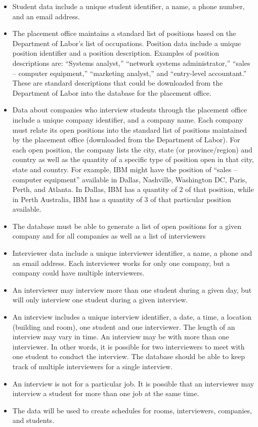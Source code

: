 \documentclass{article}
\begin{document}
\begin{itemize}
  \item Student data include a unique student identifier, a name, a phone number, and an email address.

  \item The placement office maintains a standard list of positions based on the Department of Labor’s list of occupations. Position data include a unique position identifier and a position description. Examples of position descriptions are: “Systems analyst,” “network systems administrator,” “sales – computer equipment,” “marketing analyst,” and “entry-level accountant.” These are standard descriptions that could be downloaded from the Department of Labor into the database for the placement office.

  \item Data about companies who interview students through the placement office include a unique company identifier, and a company name. Each company must relate its open positions into the standard list of positions maintained by the placement office (downloaded from the Department of Labor). For each open position, the company lists the city, state (or province/region) and country as well as the quantity of a specific type of position open in that city, state and country. For example, IBM might have the position of “sales – computer equipment” available in Dallas, Nashville, Washington DC, Paris, Perth, and Atlanta. In Dallas, IBM has a quantity of 2 of that position, while in Perth Australia, IBM has a quantity of 3 of that particular position available.

  \item The database must be able to generate a list of open positions for a given company and for all companies as well as a list of interviewers

  \item Interviewer data include a unique interviewer identifier, a name, a phone and an email address. Each interviewer works for only one company, but a company could have multiple interviewers.

  \item An interviewer may interview more than one student during a given day, but will only interview one student during a given interview.

  \item An interview includes a unique interview identifier, a date, a time, a location (building and room), one student and one interviewer. The length of an interview may vary in time. An interview may be with more than one interviewer. In other words, it is possible for two interviewers to meet with one student to conduct the interview. The database should be able to keep track of multiple interviewers for a single interview.

  \item An interview is not for a particular job. It is possible that an interviewer may interview a student for more than one job at the same time.

  \item The data will be used to create schedules for rooms, interviewers, companies, and students.
\end{itemize}
\end{document}
